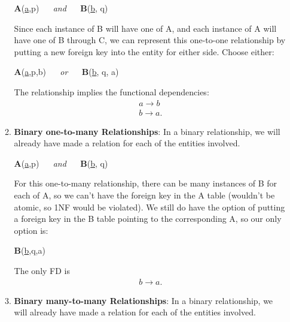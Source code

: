 \documentclass{report}
\begin{document}
\begin{itemize}
\begin{enumerate}
                    \begin{center}
                        \textbf{A}(\underline{a},p) $\quad$ \textit{and} $\quad$ \textbf{B}(\underline{b}, q)
                    \end{center}
                    \bigbreak \noindent 
                    Since each instance of B will have one of A, and each instance of A will have one of B through C, we can represent this one-to-one relationship by putting a new foreign key into the entity for either side. Choose either:
                    \begin{center}
                        \textbf{A}(\underline{a},p,b\dag) $\quad$ \textit{or} $\quad$ \textbf{B}(\underline{b}, q, a\dag)
                    \end{center}
                    \bigbreak \noindent 
                    The relationship implies the functional dependencies:
                    \begin{align*}
                        a \to b \\
                        b \to a
                    .\end{align*}
                \item \textbf{Binary one-to-many Relationships}: In a binary relationship, we will already have made a relation for each of the entities involved.
                    \begin{center}
                        \textbf{A}(\underline{a},p) $\quad$ \textit{and} $\quad$ \textbf{B}(\underline{b}, q)
                    \end{center}
                    \bigbreak \noindent 
                    For this one-to-many relationship, there can be many instances of B for each of A, so we can't have the foreign key in the A table (wouldn't be atomic, so 1NF would be violated). We still do have the option of putting a foreign key in the B table pointing to the corresponding A, so our only option is: \begin{center}
                        \textbf{B}(\underline{b},q,a\dag)
                    \end{center}
                    \bigbreak \noindent 
                    The only FD is 
                    \begin{align*}
                        b \to a 
                    .\end{align*}
                    \bigbreak \noindent 
                \item \textbf{Binary many-to-many Relationships}: In a binary relationship, we will already have made a relation for each of the entities involved.

\end{enumerate}
\end{itemize}
\end{document}
